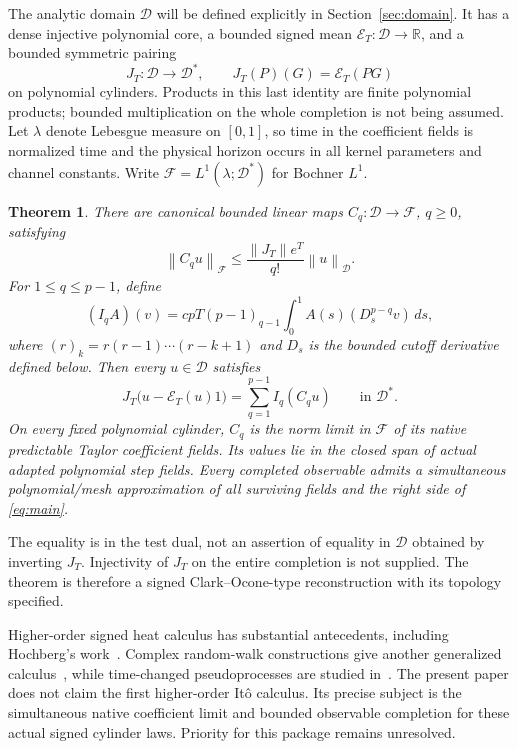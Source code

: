 \documentclass[11pt]{article}
\newtheorem{theorem}{Theorem}[section]
\theoremstyle{remark}\newtheorem{remark}[theorem]{Remark}
\newcommand{\R}{\mathbb R}\newcommand{\N}{\mathbb N}
\newcommand{\D}{\mathcal D}\newcommand{\E}{\mathcal E}
\newcommand{\norm}[1]{\left\lVert#1\right\rVert}
\begin{document}
The analytic domain $\D$ will be defined explicitly in Section~\ref{sec:domain}.
It has a dense injective polynomial core, a bounded signed mean
$\E_T:\D\to\R$, and a bounded symmetric pairing
\[
 J_T:\D\longrightarrow\D^*,\qquad
 J_T(P)(G)=\E_T(PG)
\]
on polynomial cylinders. Products in this last identity are finite
polynomial products; bounded multiplication on the whole completion
is not being assumed. Let $\lambda$ denote Lebesgue measure on
$[0,1]$, so time in the coefficient fields is normalized time and
the physical horizon occurs in all kernel parameters and channel
constants. Write $\mathcal F=L^1(\lambda;\D^*)$ for Bochner $L^1$.

\begin{theorem}\label{thm:main}
There are canonical bounded linear maps $C_q:\D\to\mathcal F$,
$q\geq0$, satisfying
\begin{equation}\label{eq:Cbound}
 \norm{C_q u}_{\mathcal F}\leq
 \frac{\norm{J_T}e^T}{q!}\norm u_{\D}.
\end{equation}
For $1\leq q\leq p-1$, define
\begin{equation}\label{eq:channel}
 (I_q A)(v)=cpT(p-1)_{q-1}
 \int_0^1 A(s)(D_s^{p-q}v)\,ds,
\end{equation}
where $(r)_k=r(r-1)\cdots(r-k+1)$ and $D_s$ is the bounded cutoff
derivative defined below. Then every $u\in\D$ satisfies
\begin{equation}\label{eq:main}
 J_T\big(u-\E_T(u)1\big)
 =\sum_{q=1}^{p-1} I_q(C_q u)\qquad\text{in }\D^*.
\end{equation}
On every fixed polynomial cylinder, $C_q$ is the norm limit in
$\mathcal F$ of its native predictable Taylor coefficient fields.
Its values lie in the closed span of actual adapted polynomial
step fields. Every completed observable admits a simultaneous
polynomial/mesh approximation of all surviving fields and the
right side of \eqref{eq:main}.
\end{theorem}

The equality is in the test dual, not an assertion of equality in
$\D$ obtained by inverting $J_T$. Injectivity of $J_T$ on the entire
completion is not supplied. The theorem is therefore a signed
Clark--Ocone-type reconstruction with its topology specified.

Higher-order signed heat calculus has substantial antecedents,
including Hochberg's work~\cite{hochberg}. Complex random-walk
constructions give another generalized calculus~\cite{bcm}, while
time-changed pseudoprocesses are studied in~\cite{co}. The present
paper does not claim the first higher-order It\^o calculus. Its
precise subject is the simultaneous native coefficient limit and
bounded observable completion for these actual signed cylinder
laws. Priority for this package remains unresolved.
\end{document}
